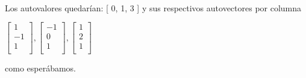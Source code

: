 \ \\ 
   Los autovalores quedarían: [ 0, 1, 3 ]  y sus respectivos autovectores por columna 
\begin{center}
$\left[ {\begin{array}{c}
1 \\
-1\\
1  \\
\end{array} } \right]  ,
\left[ {\begin{array}{c}
  -1  \\
  0 \\
  1  \\
\end{array} }\right] ,
\left[ {\begin{array}{c}
 1 \\
 2 \\
 1 \\
\end{array} } \right]$
\end{center}

como esperábamos.
